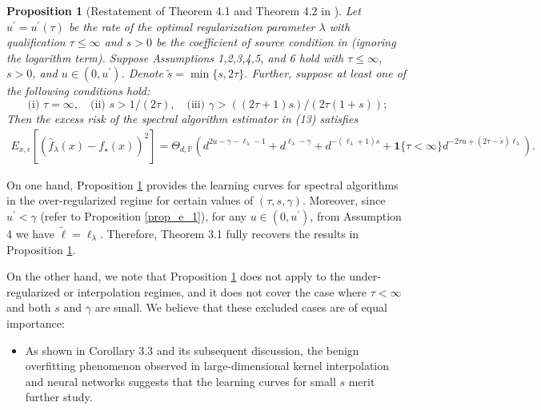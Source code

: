 \documentclass{article}
\theoremstyle{plain}
\newtheorem{proposition}[theorem]{Proposition}
\theoremstyle{definition}
\theoremstyle{remark}
\begin{document}
\begin{appendix}
\begin{proposition}[Restatement of 
Theorem 4.1 and Theorem 4.2 in \cite{lu2024saturation}]\label{prop_nips_left_learning_curve}
%
Let $u^{\prime} = u^{\prime}(\tau)$ be the rate of the optimal regularization parameter $\lambda$ with qualification $\tau \leq \infty$ and $s>0$ be the coefficient of source condition in
\cite{lu2024saturation} (ignoring the logarithm term).
  Suppose Assumptions 1,2,3,4,5,
and 6 hold with $\tau \leq \infty$, $s>0$, and $u \in (0, u^{\prime})$. 
Denote $\tilde{s}=\min\{s, 2\tau\}$.
Further, suppose at least one of the following conditions hold:
  $$
  \text{(i) } \tau =\infty, \quad \text{(ii) }s>1/(2\tau), \quad \text{(iii) } \gamma > ((2\tau+1)s) / (2\tau(1+s));
  $$
  Then the excess risk of the spectral algorithm estimator in (13) satisfies
\begin{align*}
E_{x, \epsilon} \left[ \left(\hat{f}_{\lambda}(x) - f_{\star}(x) \right)^{2} \right]
= \Theta_{d, \mathbb{P}} \left( 
d^{2u - \gamma - \ell_{\lambda} - 1}
+ d^{\ell_{\lambda} - \gamma}
+ d^{-(\ell_{\lambda} + 1)  s}
+ \mathbf{1}\{\tau<\infty\} d^{-2  \tau  u + (2  \tau - \tilde{s})  \ell_{\lambda}}
\right).
\end{align*}
\end{proposition}


On one hand, Proposition \ref{prop_nips_left_learning_curve} provides the learning curves for spectral algorithms in the over-regularized regime for certain values of $(\tau, s, \gamma)$. Moreover, since $u^{\prime} < \gamma$ (refer to Proposition \ref{prop_e_1}), for any $u \in (0, u^{\prime})$, from Assumption 4 we have $\tilde{\ell}=\ell_{\lambda}$. Therefore, Theorem 3.1 fully recovers the results in Proposition \ref{prop_nips_left_learning_curve}.




On the other hand, we note that Proposition \ref{prop_nips_left_learning_curve} does not apply to the under-regularized or interpolation regimes, and it does not cover the case where $\tau<\infty$ and both $s$ and $\gamma$ are small. We believe that these excluded cases are of equal importance:
\begin{itemize}
    \item As shown in Corollary 3.3 and its subsequent discussion, the benign overfitting phenomenon observed in large-dimensional kernel interpolation and neural networks suggests that the learning curves for small $s$ merit further study. 


\end{itemize}
\end{appendix}
\end{document}
